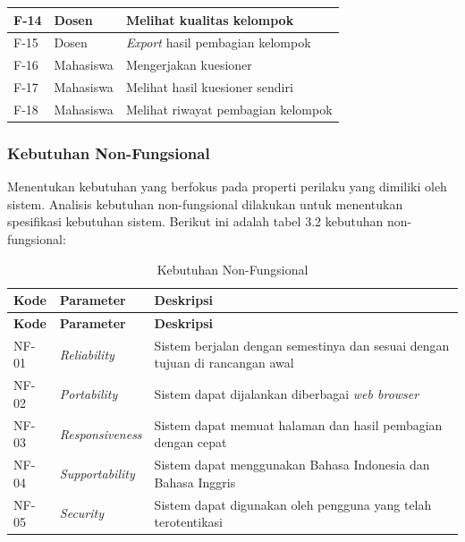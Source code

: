 \begin{longtable}{| b{}|p{}|p{}|}
	\hline
	F-14          & Dosen                   & Melihat kualitas kelompok                                     \\
	\hline
	F-15          & Dosen                   & \textit{Export} hasil pembagian kelompok                      \\
	\hline
	F-16          & Mahasiswa               & Mengerjakan kuesioner                                         \\
	\hline
	F-17          & Mahasiswa               & Melihat hasil kuesioner sendiri                               \\
	\hline
	F-18          & Mahasiswa               & Melihat riwayat pembagian kelompok                            \\
	\hline
\end{longtable}

\subsubsection{Kebutuhan Non-Fungsional}
Menentukan kebutuhan yang berfokus pada properti perilaku yang dimiliki oleh sistem. Analisis kebutuhan non-fungsional dilakukan untuk menentukan spesifikasi kebutuhan sistem. Berikut ini adalah tabel 3.2 kebutuhan non-fungsional:

\begin{longtable}{| b{}|p{}|p{}|}
	\caption{Kebutuhan Non-Fungsional}
	\label{table:3.nonfungsional}                                                                                          \\
	\hline
	\textbf{Kode} & \textbf{Parameter}      & \textbf{Deskripsi}                                                           \\
	\hline
	\endfirsthead
	\hline
	\textbf{Kode} & \textbf{Parameter}      & \textbf{Deskripsi}                                                           \\
	\hline
	\endhead
	NF-01         & \textit{Reliability}    & Sistem berjalan dengan semestinya dan sesuai dengan tujuan di rancangan awal \\
	\hline
	NF-02         & \textit{Portability}    & Sistem dapat dijalankan diberbagai \textit{web browser}                      \\
	\hline
	NF-03         & \textit{Responsiveness} & Sistem dapat memuat halaman dan hasil pembagian dengan cepat                 \\
	\hline
	NF-04         & \textit{Supportability} & Sistem dapat menggunakan Bahasa Indonesia dan Bahasa Inggris                 \\
	\hline
	NF-05         & \textit{Security}       & Sistem dapat digunakan oleh pengguna yang telah terotentikasi                \\
	\hline
\end{longtable}

